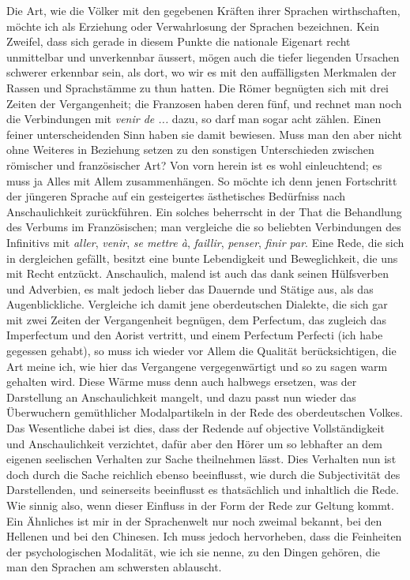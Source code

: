 Die Art, wie die Völker mit den gegebenen Kräften ihrer Sprachen wirthschaften, möchte ich als Erziehung oder Verwahrlosung der Sprachen \label{fp.409} bezeichnen. Kein Zweifel, dass sich gerade in diesem Punkte die nationale Eigenart recht unmittelbar und unverkennbar äussert, mögen auch die tiefer liegenden Ursachen schwerer erkennbar sein, als dort, wo wir es mit den auffälligsten Merkmalen der Rassen und Sprachstämme zu thun hatten. Die Römer begnügten sich mit drei Zeiten der Vergangenheit; die Franzosen haben deren fünf, und rechnet man noch die Verbindungen mit \textit{venir de ...} dazu, so darf man sogar acht zählen. Einen feiner unterscheidenden Sinn haben sie damit bewiesen. Muss man den aber nicht ohne Weiteres in Beziehung setzen zu den sonstigen Unterschieden zwischen römischer und französischer Art? Von vorn herein ist es wohl einleuchtend; es muss ja Alles mit Allem zusammenhängen. So möchte ich denn jenen Fortschritt der jüngeren Sprache auf ein gesteigertes ästhetisches Bedürfniss nach Anschaulichkeit zurückführen. Ein solches beherrscht in der \label{sp.431} That die Behandlung des Verbums im Französischen; man vergleiche die so beliebten Verbindungen des Infinitivs mit \textit{aller}, \textit{venir}, \textit{se mettre à}, \textit{faillir}, \textit{penser}, \textit{finir par}. Eine Rede, die sich in dergleichen gefällt, besitzt eine bunte Lebendigkeit und Beweglichkeit, die uns mit Recht entzückt. Anschaulich, malend ist auch das  dank seinen Hülfsverben und Adverbien, es malt jedoch lieber das Dauernde und Stätige aus, als das Augenblickliche. Vergleiche ich damit jene oberdeutschen Dialekte, die sich gar mit zwei Zeiten der Vergangenheit begnügen, dem Perfectum, das zugleich das Imperfectum und den Aorist vertritt, und einem Perfectum Perfecti (ich habe gegessen gehabt), so muss ich wieder vor Allem die Qualität berücksichtigen, die Art meine ich, wie hier das Vergangene vergegenwärtigt und so zu sagen warm gehalten wird. Diese Wärme muss denn auch halbwegs ersetzen, was der Darstellung an Anschaulichkeit mangelt, und dazu passt nun wieder das Überwuchern gemüthlicher Modalpartikeln in der Rede des oberdeutschen Volkes. Das Wesentliche dabei ist dies, dass der Redende auf objective Vollständigkeit und Anschaulichkeit verzichtet, dafür aber den Hörer um so lebhafter an dem eigenen seelischen Verhalten zur Sache theilnehmen lässt. Dies Verhalten nun ist doch durch die Sache reichlich ebenso beeinflusst, wie durch die Subjectivität des Darstellenden, und seinerseits beeinflusst es thatsächlich und inhaltlich die Rede. Wie sinnig also, wenn dieser Einfluss in der Form der Rede zur Geltung kommt. Ein Ähnliches ist mir in der Sprachenwelt nur noch zweimal bekannt, bei den Hellenen und bei den Chinesen. Ich muss jedoch \label{fp.410} hervorheben, dass die Feinheiten der psychologischen Modalität, wie ich sie nenne, zu den Dingen gehören, die man den Sprachen am schwersten ablauscht.

